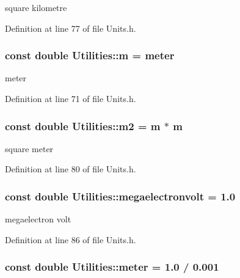 square kilometre 



Definition at line 77 of file Units.h.

\hypertarget{namespace_utilities_a205e9c8c24630292f2d0213f433503e9}{
\subsubsection[{m}]{\setlength{\rightskip}{0pt plus 5cm}const double {\bf Utilities::m} = {\bf meter}}}
\label{namespace_utilities_a205e9c8c24630292f2d0213f433503e9}


meter 



Definition at line 71 of file Units.h.

\hypertarget{namespace_utilities_aa5d500d1242875d68aabe2a7ca84dee6}{
\subsubsection[{m2}]{\setlength{\rightskip}{0pt plus 5cm}const double {\bf Utilities::m2} = {\bf m} $\ast$ {\bf m}}}
\label{namespace_utilities_aa5d500d1242875d68aabe2a7ca84dee6}


square meter 



Definition at line 80 of file Units.h.

\hypertarget{namespace_utilities_a9ae5f215b36e4775746428f61852bff9}{
\subsubsection[{megaelectronvolt}]{\setlength{\rightskip}{0pt plus 5cm}const double {\bf Utilities::megaelectronvolt} = 1.0}}
\label{namespace_utilities_a9ae5f215b36e4775746428f61852bff9}


megaelectron volt 



Definition at line 86 of file Units.h.

\hypertarget{namespace_utilities_a2b626049c35729f994e12d5f4f950d6b}{
\subsubsection[{meter}]{\setlength{\rightskip}{0pt plus 5cm}const double {\bf Utilities::meter} = 1.0 / 0.001}}
\label{namespace_utilities_a2b626049c35729f994e12d5f4f950d6b}


